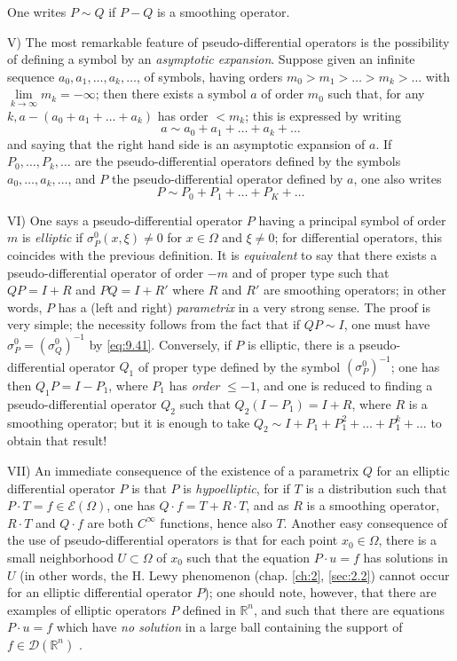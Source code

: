\documentclass[12pt,a4paper,leqno,twoside]{extbook}
\newcommand{\R}{\mathbb{R}}
\begin{document}
One writes \(P \sim{} Q\) if \(P - Q\) is a smoothing operator.

V) The most remarkable feature of pseudo-differential operators is the possibility of defining a symbol by an \emph{asymptotic expansion}. Suppose given an infinite sequence \(a_0, a_1, \ldots, a_k, \ldots\), of symbols, having orders \(m_0 > m_1 > \ldots > m_k > \ldots\) with \(\lim\limits_{k \to \infty} m_k = -\infty\); then there exists a symbol \(a\) of order \(m_0\) such that, for any \(k, a - (a_0 + a_1 + \ldots + a_k)\) has order \(< m_k\); this is expressed by writing
\[
    a \sim{} a_0 + a_1 + \ldots + a_k + \ldots
\]
and saying that the right hand side is an asymptotic expansion of \(a\). If \(P_0, \ldots, P_k, \ldots\) are the pseudo-differential operators defined by the symbols \(a_0, \ldots, a_k, \ldots\), and \(P\) the pseudo-differential operator defined by \(a\), one also writes
\[
    P \sim{} P_0 + P_1 + \ldots + P_K + \ldots
\]

VI) One says a pseudo-differential operator \(P\) having a principal symbol of order \(m\) is \emph{elliptic} if \(\sigma^0_P(x, \xi) \neq 0\) for \(x \in \Omega\) and \(\xi \neq 0\); for differential operators, this coincides with the previous definition. It is \emph{equivalent} to say that there exists a pseudo-differential operator  of order \(-m\) and of proper type such that \(QP = I+ R\) and \(PQ = I + R'\) where \(R\) and \(R'\) are smoothing operators; in other words, \(P\) has a (left and right) \emph{parametrix} in a very strong sense. The proof is very simple; the necessity follows from the fact that if \(QP \sim{} I\), one must have \(\sigma^0_P = (\sigma^0_Q)^{-1}\) by \eqref{eq:9.41}. Conversely, if \(P\) is elliptic, there is a pseudo-differential operator \(Q_1\) of proper type defined by the symbol \((\sigma^0_P)^{-1}\); one has then \(Q_1 P = I - P_1\), where \(P_1\) has \emph{order} \(\leq -1\), and one is reduced to finding a pseudo-differential operator \(Q_2\) such that \(Q_2(I - P_1) = I + R\), where \(R\) is a smoothing operator; but it is enough to take \(Q_2 \sim{} I + P_1 + P^2_1 + \ldots + P^k_1 + \ldots\) to obtain that result!

VII) An immediate consequence of the existence of a parametrix \(Q\) for an elliptic differential operator \(P\) is that \(P\) is \emph{hypoelliptic}, for if \(T\) is a distribution such that \(P \cdot T = f \in \mathcal{E}(\Omega)\), one has \(Q \cdot f = T + R \cdot T\), and as \(R\) is a smoothing operator, \(R \cdot T\) and \(Q \cdot f\) are both \(C^\infty\) functions, hence also \(T\). Another easy consequence of the use of pseudo-differential operators is that for each point \(x_0 \in \Omega\), there is a small neighborhood \(U \subset \Omega\) of \(x_0\) such that the equation \(P \cdot u = f\) has solutions in \(U\) (in other words, the H. Lewy phenomenon (chap. \ref{ch:2}, \ref{sec:2.2}) cannot occur for an elliptic differential operator \(P\)); one should note, however, that there are examples of elliptic operators \(P\) defined in \(\R^n\), and such that there are equations \(P \cdot u = f\) which have \emph{no solution} in a large ball containing the support of \(f \in \mathcal{D}(\R^n)\) \cite{176}.
\end{document}
